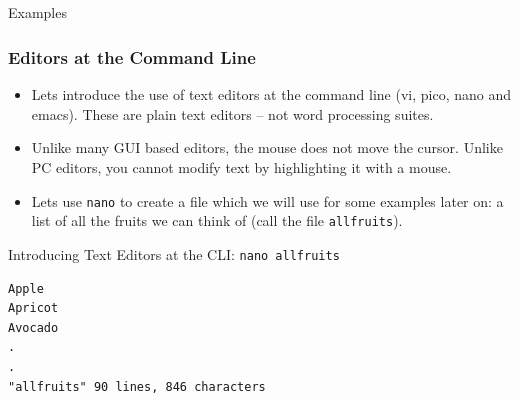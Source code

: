 \documentclass[10pt]{beamer}
\begin{document}
\subsection{}
\begin{frame}[fragile]{Examples}
\frametitle{Editors at the Command Line}
\begin{itemize}
\item Lets introduce the use of text editors at the command line (vi, pico, nano and emacs). These are plain text editors -- not word processing suites.\vspace{0.1in}
\item Unlike many GUI based editors, the mouse does not move the cursor. Unlike PC editors, you cannot modify text by highlighting it with a mouse.\vspace{0.1in}
\item Lets use \texttt{nano} to create a file which we will use for some examples later on: a list of all the fruits we can think of (call the file \texttt{allfruits}). \vspace{0.1in}
\end{itemize}
\begin{table}
\caption*{Introducing Text Editors at the CLI: \texttt{nano allfruits}}
\begin{lstlisting}[style=BashInputStyle]
Apple
Apricot
Avocado
.
.
"allfruits" 90 lines, 846 characters
\end{lstlisting}
\end{table}
\end{frame}
\end{document}

